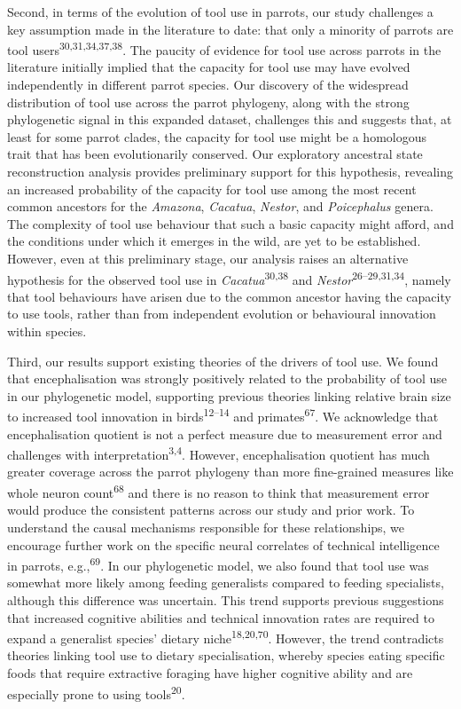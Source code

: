 \documentclass[
  man, donotrepeattitle,floatsintext]{apa6}
\begin{document}
Second, in terms of the evolution of tool use in parrots, our study challenges a
key assumption made in the literature to date: that only a minority of parrots
are tool users\textsuperscript{30,31,34,37,38}.
The paucity of evidence for tool use across parrots in the literature initially
implied that the capacity for tool use may have evolved independently in
different parrot species. Our discovery of the widespread distribution of tool
use across the parrot phylogeny, along with the strong phylogenetic signal in
this expanded dataset, challenges this and suggests that, at least for some
parrot clades, the capacity for tool use might be a homologous trait that has
been evolutionarily conserved. Our exploratory ancestral state reconstruction
analysis provides preliminary support for this hypothesis, revealing an
increased probability of the capacity for tool use among the most recent common
ancestors for the \emph{Amazona}, \emph{Cacatua}, \emph{Nestor}, and \emph{Poicephalus} genera. The
complexity of tool use behaviour that such a basic capacity might afford, and
the conditions under which it emerges in the wild, are yet to be established.
However, even at this preliminary stage, our analysis raises an alternative
hypothesis for the observed tool use in \emph{Cacatua}\textsuperscript{30,38}
and \emph{Nestor}\textsuperscript{26--29,31,34}, namely that tool behaviours have arisen due to the
common ancestor having the capacity to use tools, rather than from independent
evolution or behavioural innovation within species.

Third, our results support existing theories of the drivers of tool use. We
found that encephalisation was strongly positively related to the probability of
tool use in our phylogenetic model, supporting previous theories linking
relative brain size to increased tool innovation in birds\textsuperscript{12--14} and primates\textsuperscript{67}. We acknowledge that
encephalisation quotient is not a perfect measure due to measurement error and
challenges with interpretation\textsuperscript{3,4}. However, encephalisation
quotient has much greater coverage across the parrot phylogeny than more
fine-grained measures like whole neuron count\textsuperscript{68} and there is no reason
to think that measurement error would produce the consistent patterns across our
study and prior work. To understand the causal mechanisms responsible for these
relationships, we encourage further work on the specific neural correlates of
technical intelligence in parrots, e.g.,\textsuperscript{69}. In our phylogenetic
model, we also found that tool use was somewhat more likely among feeding
generalists compared to feeding specialists, although this difference was
uncertain. This trend supports previous suggestions that increased cognitive
abilities and technical innovation rates are required to expand a generalist
species' dietary niche\textsuperscript{18,20,70}. However, the trend contradicts theories linking tool use to
dietary specialisation, whereby species eating specific foods that require
extractive foraging have higher cognitive ability and are especially prone to
using tools\textsuperscript{20}.
\end{document}
